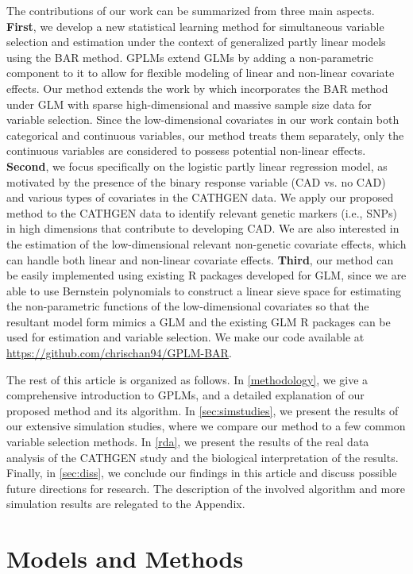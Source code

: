 \documentclass[11pt]{article}
\begin{document}
The contributions of our work can be summarized from three main aspects. {\bf First}, we develop a new statistical learning method for simultaneous variable selection and estimation under the context of generalized partly linear models using the BAR method. GPLMs extend GLMs by adding a non-parametric component to it to allow for flexible modeling of linear and non-linear covariate effects. Our method extends the work by \cite{li2021scalable} which incorporates the BAR method under GLM with sparse high-dimensional and massive sample size data for variable selection. Since the low-dimensional covariates in our work contain both categorical and continuous variables, our method treats them separately, only the continuous variables are considered to possess potential non-linear effects. {\bf Second}, we focus specifically on the logistic partly linear regression model, as motivated by the presence of the binary response variable (CAD vs. no CAD) and various types of covariates in the CATHGEN data. We apply our proposed method to the CATHGEN data to identify relevant genetic markers (i.e., SNPs) in high dimensions that contribute to developing CAD. We are also interested in the estimation of the low-dimensional relevant non-genetic covariate effects, which can handle both linear and non-linear covariate effects. {\bf Third}, our method can be easily implemented using existing R packages developed for GLM, since we are able to use Bernstein polynomials to construct a linear sieve space for estimating the non-parametric functions of the low-dimensional covariates so that the resultant model form mimics a GLM and the existing GLM R packages can be used for estimation and variable selection. We make our code available at \url{https://github.com/chrischan94/GPLM-BAR}.

The rest of this article is organized as follows. In \autoref{methodology}, we give a comprehensive introduction to GPLMs, and a detailed explanation of our proposed method and its algorithm. In \autoref{sec:simstudies}, we present the results of our extensive simulation studies, where we compare our method to a few common variable selection methods. In \autoref{rda}, we present the results of the real data analysis of the CATHGEN study and the biological interpretation of the results. Finally, in \autoref{sec:diss}, we conclude our findings in this article and discuss possible future directions for research. The description of the involved algorithm and more simulation results are relegated to the Appendix. 

\section{Models and Methods} \label{methodology}
\end{document}
